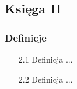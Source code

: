 \subsection{Księga II}	
\subsubsection{Definicje}	
\begin{enumerate}
    \item [2.1] Definicja ...
    \item [2.2] Definicja ...
\end{enumerate}	
	
